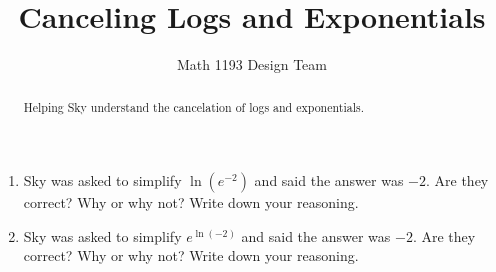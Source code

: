 \documentclass[noauthor]{ximera}
\title{Canceling Logs and Exponentials}
\author{Math 1193 Design Team}
\begin{document}
\begin{abstract}
    Helping Sky understand the cancelation of logs and exponentials.
\end{abstract}
\maketitle

\begin{enumerate}
    \item Sky was asked to simplify \(\ln(e^{-2})\) and said the answer was
    \(-2\). Are they correct? Why or why not? Write down your reasoning.
    \item Sky was asked to simplify \(e^{\ln(-2)}\) and said the answer was
    \(-2\). Are they correct? Why or why not? Write down your reasoning.
\end{enumerate}
\end{document}
